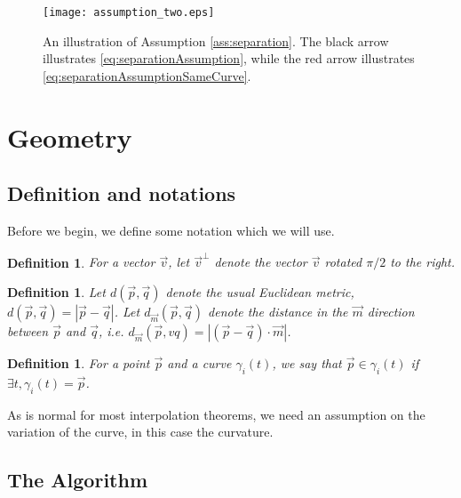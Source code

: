 \documentclass{article}
\newtheorem{definition}[cntr]{Definition}
\numberwithin{cntr}{section}
\numberwithin{equation}{section}
\newcommand{\abs}[1]{\left| #1 \right|}%
\newcommand{\vp}[0]{{\vec{p}}}
\newcommand{\vq}[0]{{\vec{q}}}
\newcommand{\vm}[0]{{\vec{m}}}
\newcommand{\vv}[0]{{\vec{v}}}
\begin{document}
\begin{figure}
\setlength{\unitlength}{0.240900pt}
\ifx\plotpoint\undefined\newsavebox{\plotpoint}\fi
\sbox{\plotpoint}{\rule[-0.200pt]{0.400pt}{0.400pt}}%
\texttt{[image: assumption\_two.eps]}

\caption{An illustration of Assumption \ref{ass:separation}. The black arrow illustrates \eqref{eq:separationAssumption}, while the red arrow illustrates \eqref{eq:separationAssumptionSameCurve}.}
\label{fig:separationBetweenCurves}
\end{figure}

\section{Geometry}
\subsection{Definition and notations}
Before we begin, we define some notation which we will use.

\begin{definition}
  \label{def:perp}
  For a vector $\vv$, let $\vv^{\perp}$ denote the vector $\vv$ rotated $\pi/2$ to the right.
\end{definition}

\begin{definition}
  \label{def:metric}
  Let $d(\vp,\vq)$ denote the usual Euclidean metric, $d(\vp,\vq) = \abs{\vp - \vq}$. Let $d_{\vm}(\vp,\vq)$ denote the distance in the $\vm$ direction between $\vp$ and $\vq$, i.e. $d_{\vm}(\vp,vq) = \abs{ (\vp - \vq) \cdot \vm}$.
\end{definition}

\begin{definition}
  For a point $\vp$ and a curve $\gamma_{i}(t)$, we say that $\vp \in \gamma_{i}(t)$ if $\exists t, \gamma_{i}(t)=\vp$.
\end{definition}

As is normal for most interpolation theorems, we need an assumption on the variation of the curve, in this case the curvature.

\subsection{The Algorithm}
\end{document}
